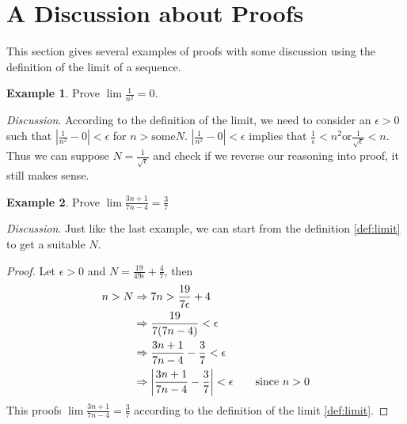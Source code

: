 \documentclass[12pt, lettersize]{book}
\theoremstyle{plain}
\theoremstyle{definition}
\newtheorem*{eg}{Example}
\theoremstyle{remark}
\begin{document}
	\newpage
	
	\section{A Discussion about Proofs}
	This section gives several examples of proofs with some discussion using the definition of the limit of a sequence.
	\begin{eg}
		Prove $\lim \frac{1}{n^2}=0$.
	\end{eg}
	\emph{Discussion}. According to the definition of the limit, we need to consider an $\epsilon >0$ such that $|\frac{1}{n^2}-0|<\epsilon$ for $n>\text{some}N$.
	$|\frac{1}{n^2}-0|<\epsilon$ implies that $\frac{1}{\epsilon}<n^2 \text{or} \frac{1}{\sqrt{\epsilon}}<n$.
	Thus we can suppose $N=\frac{1}{\sqrt{\epsilon}}$ and check if we reverse our reasoning into proof, it still makes sense. 
	
	\begin{eg}
		Prove $\lim \frac{3n+1}{7n-4}=\frac{3}{7}$
	\end{eg}
	\emph{Discussion}. Just like the last example, we can start from the definition \ref{def:limit} to get a suitable $N$.
	\begin{proof}
		Let $\epsilon>0$ and $N=\frac{19}{49\epsilon}+\frac{4}{7}$, then
		\begin{align*}
			n>N &\Rightarrow 7n>\frac{19}{7\epsilon}+4\\
			&\Rightarrow \frac{19}{7(7n-4)}<\epsilon\\
			&\Rightarrow \frac{3n+1}{7n-4} - \frac{3}{7}<\epsilon\\
			&\Rightarrow \abs{\frac{3n+1}{7n-4} - \frac{3}{7}}<\epsilon\qquad \text{since}\ n>0
		\end{align*}
		This proofs $\lim \frac{3n+1}{7n-4}=\frac{3}{7}$ according to the definition of the limit \ref{def:limit}.
	\end{proof}
	
\end{document}
